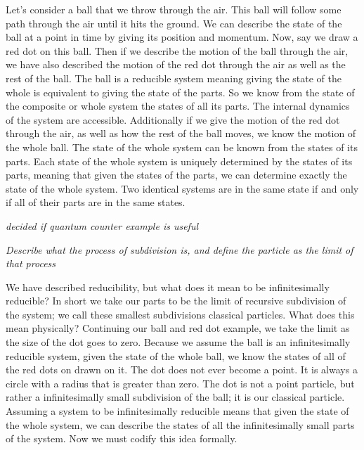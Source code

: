 \documentclass{article}
\begin{document}
	Let's consider a ball that we throw through the air. This ball will follow some path through the air until it hits the ground. We can describe the state of the ball at a point in time by giving its position and momentum. Now, say we draw a red dot on this ball. Then if we describe the motion of the ball through the air, we have also described the motion of the red dot through the air as well as the rest of the ball. The ball is a reducible system meaning giving the state of the whole is equivalent to giving the state of the parts. So we know from the state of the composite or whole system the states of all its parts. The internal dynamics of the system are accessible. Additionally if we give the motion of the red dot through the air, as well as how the rest of the ball moves, we know the motion of the whole ball. The state of the whole system can be known from the states of its parts. Each state of the whole system is uniquely determined by the states of its parts, meaning that given the states of the parts, we can determine exactly the state of the whole system. Two identical systems are in the same state if and only if all of their parts are in the same states.
	
	\emph{decided if quantum counter example is useful}
	
	 
	 \emph{Describe what the process of subdivision is, and define the particle as the limit of that process}
	 
	 We have described reducibility, but what does it mean to be infinitesimally reducible? In short we take our parts to be the limit of recursive subdivision of the system; we call these smallest subdivisions classical particles. What does this mean physically? Continuing our ball and red dot example, we take the limit as the size of the dot goes to zero. Because we assume the ball is an infinitesimally reducible system, given the state of the whole ball, we know the states of all of the red dots on drawn on it. The dot does not ever become a point. It is always a circle with a radius that is greater than zero. The dot is not a point particle, but rather a infinitesimally small subdivision of the ball; it is our classical particle. Assuming a system to be infinitesimally reducible means that given the state of the whole system, we can describe the states of all the infinitesimally small parts of the system.  Now we must codify this idea formally.
	 
\end{document}
